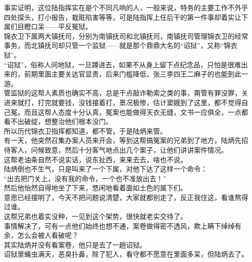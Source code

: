 \begin{multicols}{\theparacolNo}
事实证明，这位陆指挥实在是个不同凡响的人，一般来说，特务的主要工作不外乎四处探头，打小报告，栽赃陷害等等，可是陆指挥上任后干的第一件事却着实让下属们目瞪口呆——平反冤狱。\\

锦衣卫下属两大镇抚司，分别为南镇抚司和北镇抚司，南镇抚司管理锦衣卫的经常事务，而北镇抚司却只管一个监狱——就是那个鼎鼎大名的“诏狱”，又称“锦衣狱”。\\

“诏狱”，俗称人间地狱，一旦蹲进去，如果不从身上留下点纪念品，只怕是很难出来的，前期里面主要关达官显贵，后来门槛降低，张三李四王二麻子的也能到此一游。\\

管监狱的这帮人素质也确实不高，总是干点敲诈勒索之类的事，甭管有罪没罪，关进来就打，打完就要钱，没钱接着打，景况极惨，估计窦娥到了这里，都不觉得自己冤。而且这帮人态度十分认真，冤案也能做得天衣无缝，文书一应俱全，一点都看不出破绽，想整治他们根本没门。\\

所以历代锦衣卫指挥都知道，都不管，于是陆炳来管。\\

有一天，他突然召集办案人员来开会，等到这帮搞冤案的兄弟到了地方，陆炳先招待客人，问候致意，然后十分客气地点出几个案子，让他们讲讲案件情况。\\

这帮老油条自然不说实话，说东扯西，来来去去，啥也不说。\\

陆炳倒也不生气，只是叫来了一个下属，对他下达了这样一个命令：\\

“出去把门关上，没有我的命令，一个也不准放出去！”\\

然后他怡然自得地坐了下来，悠闲地看着面如土色的属下们。\\

意思已经摆明了，今天不把问题说清楚，大家就都别走了，反正我住这，看谁熬得过谁。\\

这帮兄弟也着实没种，一见到这个架势，很快就老实交待了。\\

事情解决了，可有一点他们始终也想不通，案卷做得密不透风，欺上瞒下绰绰有余，怎么会被人看破呢？\\

其实陆炳并没有看案卷，他只是去了一趟诏狱。\\

诏狱里蝇虫满天，恶臭扑鼻，除了犯人，看守都不愿意在里面多呆，但陆炳去了。\\


\end{multicols}
